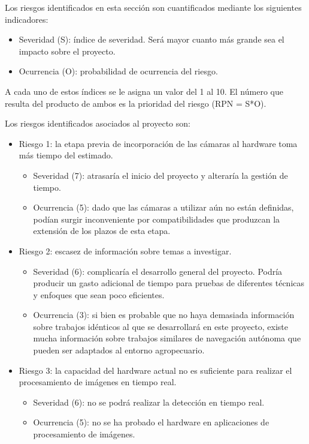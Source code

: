 \documentclass[
11pt, %
]{charter}
\begin{document}
Los riesgos identificados en esta sección son cuantificados mediante los siguientes indicadores:

\begin{itemize}
    \item Severidad (S): índice de severidad. Será mayor cuanto más grande sea el impacto sobre el proyecto.
    \item Ocurrencia (O): probabilidad de ocurrencia del riesgo.
\end{itemize}
	
A cada uno de estos índices se le asigna un valor del 1 al 10. El número que resulta del producto de ambos es la prioridad del riesgo (RPN = S*O).

Los riesgos identificados asociados al proyecto son:

\begin{itemize}
	\item Riesgo 1: la etapa previa de incorporación de las cámaras al hardware toma más tiempo del estimado.
	\begin{itemize}
		\item Severidad (7): atrasaría el inicio del proyecto y alteraría la gestión de tiempo.
		\item Ocurrencia (5): dado que las cámaras a utilizar aún no están definidas, podían surgir inconveniente por compatibilidades que produzcan la extensión de los plazos de esta etapa. 
	\end{itemize}
	
	\item Riesgo 2: escasez de información sobre temas a investigar.
	\begin{itemize}
		\item Severidad (6): complicaría el desarrollo general del proyecto. Podría producir un gasto adicional de tiempo para pruebas de diferentes técnicas y enfoques que sean poco eficientes.
		\item Ocurrencia (3): si bien es probable que no haya demasiada información sobre trabajos idénticos al que se desarrollará en este proyecto, existe mucha información sobre trabajos similares de navegación autónoma que pueden ser adaptados al entorno agropecuario.
	\end{itemize}
	
	\item Riesgo 3: la capacidad del hardware actual no es suficiente para realizar el procesamiento de imágenes en tiempo real.
	\begin{itemize}
		\item Severidad (6): no se podrá realizar la detección en tiempo real.
		\item Ocurrencia (5): no se ha probado el hardware en aplicaciones de procesamiento de imágenes.
	\end{itemize}
	

\end{itemize}
\end{document}
